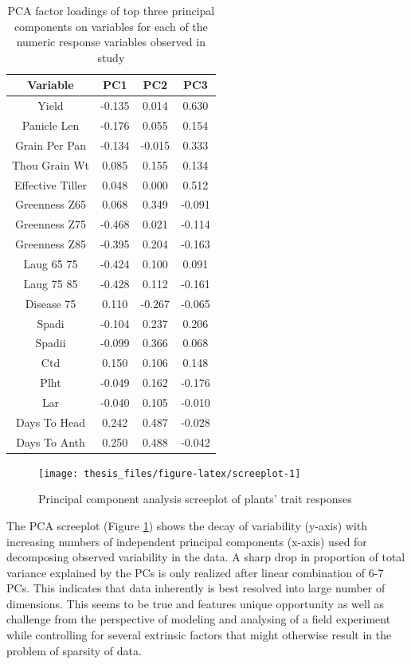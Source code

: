 \documentclass[12pt,oneside]{dukestatscithesis} %
\begin{document}
\begin{table}[H]

\caption{\label{tab:principal-component-loadings}PCA factor loadings of top three principal components on variables for each of the numeric response variables observed in study}
\centering
\fontsize{11}{13}\selectfont
\begin{tabular}[t]{cccc}
\toprule
\textbf{Variable} & \textbf{PC1} & \textbf{PC2} & \textbf{PC3}\\
\midrule
Yield & -0.135 & 0.014 & 0.630\\
Panicle Len & -0.176 & 0.055 & 0.154\\
Grain Per Pan & -0.134 & -0.015 & 0.333\\
Thou Grain Wt & 0.085 & 0.155 & 0.134\\
Effective Tiller & 0.048 & 0.000 & 0.512\\
Greenness Z65 & 0.068 & 0.349 & -0.091\\
Greenness Z75 & -0.468 & 0.021 & -0.114\\
Greenness Z85 & -0.395 & 0.204 & -0.163\\
Laug 65 75 & -0.424 & 0.100 & 0.091\\
Laug 75 85 & -0.428 & 0.112 & -0.161\\
Disease 75 & 0.110 & -0.267 & -0.065\\
Spadi & -0.104 & 0.237 & 0.206\\
Spadii & -0.099 & 0.366 & 0.068\\
Ctd & 0.150 & 0.106 & 0.148\\
Plht & -0.049 & 0.162 & -0.176\\
Lar & -0.040 & 0.105 & -0.010\\
Days To Head & 0.242 & 0.487 & -0.028\\
Days To Anth & 0.250 & 0.488 & -0.042\\
\bottomrule
\end{tabular}
\end{table}
\begin{figure}[H]

{\centering \texttt{[image: thesis\_files/figure-latex/screeplot-1]} 

}

\caption{Principal component analysis screeplot of plants' trait responses}\label{fig:screeplot}
\end{figure}
The PCA screeplot (Figure \ref{fig:screeplot}) shows the decay of variability (y-axis) with increasing numbers of independent principal components (x-axis) used for decomposing observed variability in the data. A sharp drop in proportion of total variance explained by the PCs is only realized after linear combination of 6-7 PCs. This indicates that data inherently is best resolved into large number of dimensions. This seems to be true and features unique opportunity as well as challenge from the perspective of modeling and analysing of a field experiment while controlling for several extrinsic factors that might otherwise result in the problem of sparsity of data.
\end{document}
